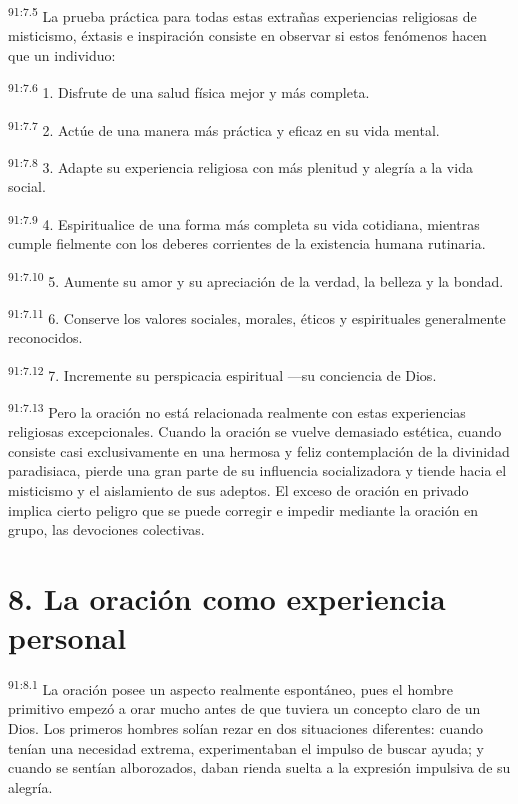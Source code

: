 \par
\textsuperscript{91:7.5} La prueba práctica para todas estas extrañas experiencias religiosas de misticismo, éxtasis e inspiración consiste en observar si estos fenómenos hacen que un individuo:

\par
\textsuperscript{91:7.6} 1. Disfrute de una salud física mejor y más completa.

\par
\textsuperscript{91:7.7} 2. Actúe de una manera más práctica y eficaz en su vida mental.

\par
\textsuperscript{91:7.8} 3. Adapte su experiencia religiosa con más plenitud y alegría a la vida social.

\par
\textsuperscript{91:7.9} 4. Espiritualice de una forma más completa su vida cotidiana, mientras cumple fielmente con los deberes corrientes de la existencia humana rutinaria.

\par
\textsuperscript{91:7.10} 5. Aumente su amor y su apreciación de la verdad, la belleza y la bondad.

\par
\textsuperscript{91:7.11} 6. Conserve los valores sociales, morales, éticos y espirituales generalmente reconocidos.

\par
\textsuperscript{91:7.12} 7. Incremente su perspicacia espiritual ---su conciencia de Dios.

\par
\textsuperscript{91:7.13} Pero la oración no está relacionada realmente con estas experiencias religiosas excepcionales. Cuando la oración se vuelve demasiado estética, cuando consiste casi exclusivamente en una hermosa y feliz contemplación de la divinidad paradisiaca, pierde una gran parte de su influencia socializadora y tiende hacia el misticismo y el aislamiento de sus adeptos. El exceso de oración en privado implica cierto peligro que se puede corregir e impedir mediante la oración en grupo, las devociones colectivas.

\section*{8. La oración como experiencia personal}
\par
\textsuperscript{91:8.1} La oración posee un aspecto realmente espontáneo, pues el hombre primitivo empezó a orar mucho antes de que tuviera un concepto claro de un Dios. Los primeros hombres solían rezar en dos situaciones diferentes: cuando tenían una necesidad extrema, experimentaban el impulso de buscar ayuda; y cuando se sentían alborozados, daban rienda suelta a la expresión impulsiva de su alegría.

